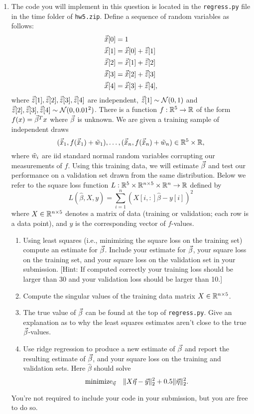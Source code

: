 \documentclass[12pt,twoside]{article}
\begin{document}
\begin{enumerate}
\item The code you will implement in this question is located in the
  \verb|regress.py| file in the time folder of  \verb|hw5.zip|.
  Define a sequence of random variables as follows:
  \begin{align*}
    \vec{\tilde{ x }} [0] &= 1\\
    \vec{\tilde{ x }}[1] &= \vec{\tilde{ x }}[0]+\vec{\tilde{ z }}[1]\\
    \vec{\tilde{ x }}[2] &= \vec{\tilde{ x }}[1]+\vec{\tilde{ z }}[2]\\
    \vec{\tilde{ x }}[3] &= \vec{\tilde{ x }}[2]+\vec{\tilde{ z }}[3]\\
    \vec{\tilde{ x }}[4] &= \vec{\tilde{ x }}[3]+\vec{\tilde{ z }}[4],
  \end{align*}
  where $\vec{\tilde{ z }}[1],\vec{\tilde{ z }}[2],\vec{\tilde{ z }}[3],\vec{\tilde{ z }}[4]$ are independent,
  $\vec{\tilde{ z }}[1]\sim\operatorname{\mathcal{N}}(0,1)$ and
  $\vec{\tilde{ z }}[2],\vec{\tilde{ z }}[3],\vec{\tilde{ z }}[4]\sim\operatorname{\mathcal{N}}(0,0.01^2)$.  There is a function
  $f:\mathbb{R}^5\to\mathbb{R}$ of the form $f(x)=\vec{\beta}^Tx$ where $\vec{\beta}$ is
  unknown.  We are given a training sample of independent draws
  $$(\vec{\tilde{ x }}_1,f(\vec{\tilde{ x }}_1)+\tilde{ w }_1),\ldots,(\vec{\tilde{ x }}_n,f(\vec{\tilde{ x }}_n)+\tilde{ w }_n)\in\mathbb{R}^5\times\mathbb{R},$$
  where $\tilde{ w }_i$ are iid standard normal random variables corrupting
  our measurements of $f$.
  Using this training data, we will estimate $\vec{\beta}$ and test our
  performance on a validation set drawn from the same distribution.
  Below we refer to the square loss function
  $L:\mathbb{R}^5\times\mathbb{R}^{n\times 5}\times\mathbb{R}^n\to\mathbb{R}$ defined by
  $$L(\hat{\beta},X,y) = \sum_{i=1}^n (X[i,:]\hat{\beta}-y[i])^2$$
  where $X\in\mathbb{R}^{n\times 5}$ denotes a matrix of data (training or validation; each row
  is a data point), and $y$ is the corresponding vector of $f$-values.
  \begin{enumerate}
  \item Using least squares (i.e., minimizing the square loss on the
    training set) compute an estimate for $\vec{\beta}$.  Include your
    estimate for $\vec{\beta}$, your square loss on the training set, and
    your square loss on the validation set in your submission.
    [Hint: If computed correctly your training loss should be larger
      than 30 and your validation loss should be larger than 10.]
  \item Compute the singular values of the training data matrix
    $X\in\mathbb{R}^{n\times 5}$.
  \item The true value of $\vec{\beta}$ can be found at the top of
    \verb|regress.py|.  Give an explanation as to why the least squares
    estimates aren't close to the true $\vec{\beta}$-values.
  \item Use ridge regression to produce a new estimate of $\vec{\beta}$
    and report the resulting estimate of $\vec{\beta}$, and
    your square loss on the training and validation sets.  Here
    $\hat{\beta}$ should solve
    $$\text{minimize}_{\vec{\eta}}\quad \|X\vec{\eta}-\vec{y}\|_2^2 + 0.5\|\vec{\eta}\|_2^2.$$
  \end{enumerate}
You're not required to include your code in your submission, but you are free to do so. 
 \end{enumerate}
\end{document}
